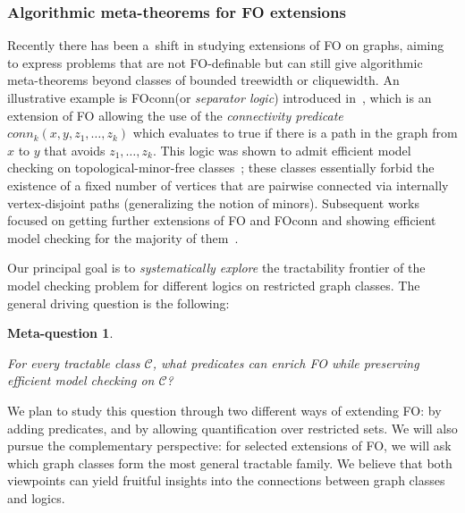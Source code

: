 \documentclass[a4paper,11pt]{article}
\newcommand{\fo}{\textsf{FO}\xspace}
\newcommand{\foconn}{\textsf{FO\text{+}conn}\xspace}
\newcommand{\mso}{\textsf{MSO}\xspace}
\newtheorem{metaquest}{Meta-question}
\newenvironment{metaquestion}
  {\begin{metaquest}\begin{mdframed}[style=metaquestionstyle]}
  {\end{mdframed}\end{metaquest}}
\begin{document}
\subsubsection{Algorithmic meta-theorems for \fo extensions}\label{subtask:1.1}
Recently there has been a~shift in studying extensions of \fo on graphs, aiming to express problems that are not \fo-definable but can still give algorithmic meta-theorems beyond classes of bounded treewidth or cliquewidth.
An illustrative example is \foconn (or \emph{separator logic}) introduced in~\cite{Bojanczyk21separ,SchirrmacherSV22first}, which is an extension of \fo allowing the use of the \textit{connectivity predicate}
$conn_k(x,y,z_1,\ldots,z_k)$ which evaluates to true if there is a path in the graph from $x$ to $y$ that avoids $z_1,\ldots,z_k$.
This logic was shown to admit efficient model checking on topological-minor-free classes~\cite{PilipczukSSTV22algor}; these classes essentially forbid the existence of a fixed number of vertices that are pairwise connected via internally vertex-disjoint paths (generalizing the notion of minors).
Subsequent works focused on getting further extensions of \fo and
\textsf{FO\text{+}conn}
and showing efficient model checking for the majority of them~\cite{SchirrmacherSSTV24mode,FominGSST24comp,SauST25para,BojanczykPPSS25lowrank}.

Our principal goal is to \emph{systematically explore} the tractability frontier of the model checking problem for different logics on restricted
graph classes. 
The general driving question is the following:

\begin{metaquestion}\label{q:enrich}
For every tractable class $\mathcal C$, what predicates can enrich \fo while preserving efficient model checking on $\mathcal C$?
\end{metaquestion}

We plan to study this question through two different ways of extending \fo: by adding predicates, and by allowing quantification over restricted sets.
We will also pursue the complementary perspective: for selected extensions of \fo, we will ask which graph classes form the most general tractable family.
We believe that both viewpoints can yield fruitful insights into the connections between graph classes and logics.
\end{document}
